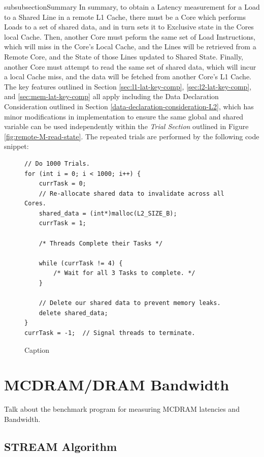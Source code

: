 \documentclass[bsc,frontabs,twoside,singlespacing,parskip,deptreport]{infthesis}     %
\begin{document}
subsubsection{Summary}
In summary, to obtain a Latency measurement for a Load to a Shared Line in a remote L1 Cache, there must be a Core which performs Loads to a set of shared data, and in turn sets it to Exclusive state in the Cores local Cache. Then, another Core must peform the same set of Load Instructions, which will miss in the Core's Local Cache, and the Lines will be retrieved from a Remote Core, and the State of those Lines updated to Shared State. Finally, another Core must attempt to read the same set of shared data, which will incur a local Cache miss, and the data will be fetched from another Core's L1 Cache. The key features outlined in Section \ref{sec:l1-lat-key-comp}, \ref{sec:l2-lat-key-comp}, and \ref{sec:mem-lat-key-comp} all apply including the Data Declaration Consideration outlined in Section \ref{data-declaration-consideration-L2}, which has minor modifications in implementation to ensure the same global and shared variable can be used independently within the \textit{Trial Section} outlined in Figure \ref{fig:remote-M-read-state}. The repeated trials are performed by the following code snippet:
\begin{figure}[!h]
    \centering
    \begin{minipage}{0.8\textwidth}
    \begin{verbatim}
// Do 1000 Trials.
for (int i = 0; i < 1000; i++) {
    currTask = 0;
    // Re-allocate shared data to invalidate across all Cores.
    shared_data = (int*)malloc(L2_SIZE_B);
    currTask = 1;

    /* Threads Complete their Tasks */
        
    while (currTask != 4) {
        /* Wait for all 3 Tasks to complete. */
    }

    // Delete our shared data to prevent memory leaks.
    delete shared_data;
}
currTask = -1;  // Signal threads to terminate.
    \end{verbatim}
    \end{minipage}
    \caption{Caption}
    \label{fig:remote-S-repeat}
\end{figure}

\newpage


\section{MCDRAM/DRAM Bandwidth}\label{mcdram-dram-benchmarks-bw}
Talk about the benchmark program for measuring MCDRAM latencies and Bandwidth.
\subsection{STREAM Algorithm}
\end{document}
